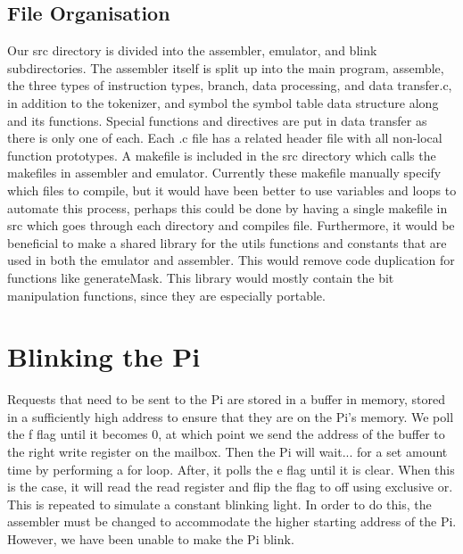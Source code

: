 \documentclass[11pt]{article}
\begin{document}
\subsection{File Organisation}
Our src directory is divided into the assembler, emulator, and blink subdirectories. The assembler itself is split up into the main program, assemble, the three types of instruction types, branch, data processing, and data transfer.c, in addition to the tokenizer, and symbol the symbol table data structure along and its functions. Special functions and directives are put in data transfer as there is only one of each. Each .c file has a related header file with all non-local function prototypes. A makefile is included in the src directory which calls the makefiles in assembler and emulator. Currently these makefile manually specify which files to compile, but it would have been better to use variables and loops to automate this process, perhaps this could be done by having a single makefile in src which goes through each directory and compiles file. Furthermore, it would be beneficial to make a shared library for the utils functions and constants that are used in both the emulator and assembler. This would remove code duplication for functions like generateMask. This library would mostly contain the bit manipulation functions, since they are especially portable. 

\section{Blinking the Pi}
Requests that need to be sent to the Pi are stored in a buffer in memory, stored in a sufficiently high address to ensure that they are on the Pi's memory. We poll the f flag until it becomes 0, at which point we send the address of the buffer to the right write register on the mailbox. Then the Pi will wait... for a set amount time by performing a for loop. After, it polls the e flag until it is clear. When this is the case, it will read the read register and flip the flag to off using exclusive or. This is repeated to simulate a constant blinking light. In order to do this, the assembler must be changed to accommodate the higher starting address of the Pi. However, we have been unable to make the Pi blink. 
\end{document}
